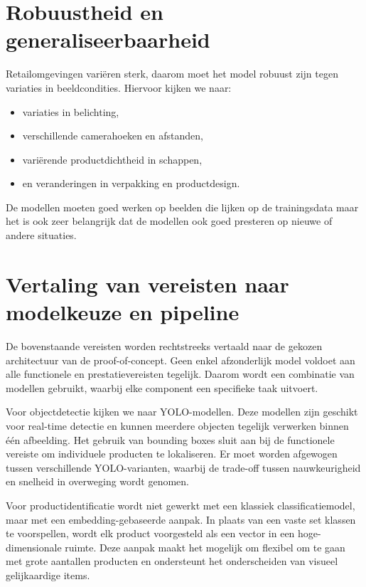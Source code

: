 \section{Robuustheid en generaliseerbaarheid}

Retailomgevingen variëren sterk, daarom moet het model robuust zijn tegen variaties in beeldcondities. Hiervoor kijken we naar:
\begin{itemize}
    \item variaties in belichting,
    \item verschillende camerahoeken en afstanden,
    \item variërende productdichtheid in schappen,
    \item en veranderingen in verpakking en productdesign.
\end{itemize}

De modellen moeten goed werken op beelden die lijken op de trainingsdata maar het is ook zeer belangrijk dat de modellen ook goed presteren op nieuwe of andere situaties.

\section{Vertaling van vereisten naar modelkeuze en pipeline}

De bovenstaande vereisten worden rechtstreeks vertaald naar de gekozen architectuur van de proof-of-concept. Geen enkel afzonderlijk model voldoet aan alle functionele en prestatievereisten tegelijk. Daarom wordt een combinatie van modellen gebruikt, waarbij elke component een specifieke taak uitvoert.

Voor objectdetectie kijken we naar YOLO-modellen. Deze modellen zijn geschikt voor real-time detectie en kunnen meerdere objecten tegelijk verwerken binnen één afbeelding. Het gebruik van bounding boxes sluit aan bij de functionele vereiste om individuele producten te lokaliseren. Er moet worden afgewogen tussen verschillende YOLO-varianten, waarbij de trade-off tussen nauwkeurigheid en snelheid in overweging wordt genomen.

Voor productidentificatie wordt niet gewerkt met een klassiek classificatiemodel, maar met een embedding-gebaseerde aanpak. In plaats van een vaste set klassen te voorspellen, wordt elk product voorgesteld als een vector in een hoge-dimensionale ruimte. Deze aanpak maakt het mogelijk om flexibel om te gaan met grote aantallen producten en ondersteunt het onderscheiden van visueel gelijkaardige items.

